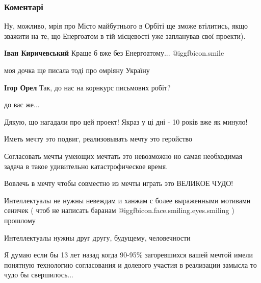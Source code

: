 
 
 
 
 
\subsubsection{Коментарі}
\label{sec:04_12_2021.fb.tolkachev_aleksej.1.mria_pro_ukrainu.cmt}

\begin{itemize} %

Ну, можливо, мрія про Місто майбутнього в Орбіті ще зможе втілитись, якщо
зважити на те, що Енергоатом в тій місцевості уже запланував свої проекти).

\textbf{Іван Киричевський} Краще б вже без Енергоатому...  @igg{fbicon.smile} 

моя дочка ще писала тоді про омріяну Україну

\begin{itemize} %
\textbf{Ігор Орел} Так, до нас на корнкурс письмових робіт?

до вас же...

Дякую, що нагадали про цей проект! Якраз у ці дні - 10 років вже як минуло!
\end{itemize} %


Иметь мечту это подвиг, реализовывать мечту это геройство

Согласовать мечты умеющих мечтать это невозможно но самая необходимая задача в
такое удивительно катастрофическое время.

Вовлечь в мечту чтобы совместно из мечты играть это ВЕЛИКОЕ ЧУДО!

Интеллектуалы не нужны невеждам и ханжам с более выраженными мотивами сеничек (
чтоб не написать баранам  @igg{fbicon.face.smiling.eyes.smiling} ) прошлому

Интеллектуалы нужны друг другу, будущему, человечности

Я думаю если бы 13 лет назад когда 90-95\% загоревшихся вашей мечтой имели
понятную технологию согласования и долевого участия в реализации замысла то
чудо бы свершилось...


\end{itemize}
